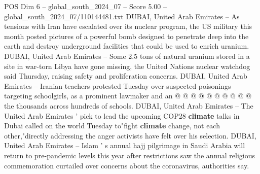\begin{textsample}{POS Dim 6 – global\_south\_2024\_07 – Score 5.00 – global\_south\_2024\_07/110144481.txt}
DUBAI, United Arab Emirates -- As tensions with Iran have escalated over its nuclear program, the US military this month posted pictures of a powerful bomb designed to penetrate deep into the earth and destroy underground facilities that could be used to enrich uranium.
DUBAI, United Arab Emirates -- Some 2.5 tons of natural uranium stored in a site in war-torn Libya have gone missing, the United Nations nuclear watchdog said Thursday, raising safety and proliferation concerns.
DUBAI, United Arab Emirates -- Iranian teachers protested Tuesday over suspected poisonings targeting schoolgirls, as a prominent lawmaker and an @ @ @ @ @ @ @ @ @ @ the thousands across hundreds of schools.
DUBAI, United Arab Emirates -- The United Arab Emirates ' pick to lead the upcoming COP28 \textbf{climate} talks in Dubai called on the world Tuesday to"fight \textbf{climate} change, not each other,"directly addressing the anger activists have felt over his selection.
DUBAI, United Arab Emirates -- Islam ' s annual hajj pilgrimage in Saudi Arabia will return to pre-pandemic levels this year after restrictions saw the annual religious commemoration curtailed over concerns about the coronavirus, authorities say.

\end{textsample}
